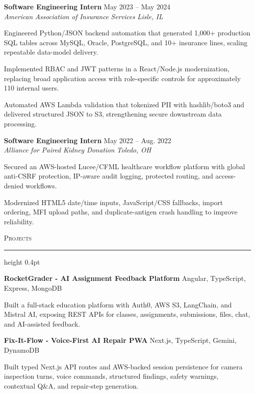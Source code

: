 \documentclass[letterpaper,11pt]{article}
\newcommand{\resumesection}[1]{%
  \par\vspace{2pt}%
  {\large\scshape #1}\par\vspace{2pt}%
  \hrule height 0.4pt\vspace{2pt}%
}
\newcommand{\resumeSubheading}[4]{
  \textbf{#1} \hfill #2\\
  \textit{#3} \hfill \textit{#4}
}
\newcommand{\projectHeading}[2]{
  \textbf{#1} \hfill #2
}
\begin{document}
\resumeSubheading
{Software Engineering Intern}{May 2023 -- May 2024}
{American Association of Insurance Services}{Lisle, IL}
\begin{tightitemize}
  \item Engineered Python/JSON backend automation that generated 1,000+ production SQL tables across MySQL, Oracle, PostgreSQL, and 10+ insurance lines, scaling repeatable data-model delivery.
  \item Implemented RBAC and JWT patterns in a React/Node.js modernization, replacing broad application access with role-specific controls for approximately 110 internal users.
  \item Automated AWS Lambda validation that tokenized PII with hashlib/boto3 and delivered structured JSON to S3, strengthening secure downstream data processing.
\end{tightitemize}

\resumeSubheading
{Software Engineering Intern}{May 2022 -- Aug. 2022}
{Alliance for Paired Kidney Donation}{Toledo, OH}
\begin{tightitemize}
  \item Secured an AWS-hosted Lucee/CFML healthcare workflow platform with global anti-CSRF protection, IP-aware audit logging, protected routing, and access-denied workflows.
  \item Modernized HTML5 date/time inputs, JavaScript/CSS fallbacks, import ordering, MFI upload paths, and duplicate-antigen crash handling to improve reliability.
\end{tightitemize}

\resumesection{Projects}
\projectHeading{RocketGrader - AI Assignment Feedback Platform}{Angular, TypeScript, Express, MongoDB}
\begin{tightitemize}
  \item Built a full-stack education platform with Auth0, AWS S3, LangChain, and Mistral AI, exposing REST APIs for classes, assignments, submissions, files, chat, and AI-assisted feedback.
\end{tightitemize}

\projectHeading{Fix-It-Flow - Voice-First AI Repair PWA}{Next.js, TypeScript, Gemini, DynamoDB}
\begin{tightitemize}
  \item Built typed Next.js API routes and AWS-backed session persistence for camera inspection turns, voice commands, structured findings, safety warnings, contextual Q\&A, and repair-step generation.
\end{tightitemize}
\end{document}

